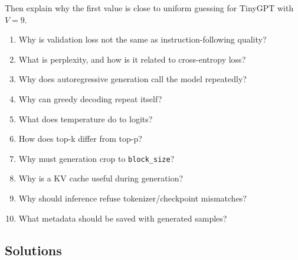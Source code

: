 Then explain why the first value is close to uniform guessing for TinyGPT with \(V=9\).

\checkpoint

\begin{enumerate}
  \item Why is validation loss not the same as instruction-following quality?
  \item What is perplexity, and how is it related to cross-entropy loss?
  \item Why does autoregressive generation call the model repeatedly?
  \item Why can greedy decoding repeat itself?
  \item What does temperature do to logits?
  \item How does top-k differ from top-p?
  \item Why must generation crop to \texttt{block\_size}?
  \item Why is a KV cache useful during generation?
  \item Why should inference refuse tokenizer/checkpoint mismatches?
  \item What metadata should be saved with generated samples?
\end{enumerate}

\subsection*{Solutions}

